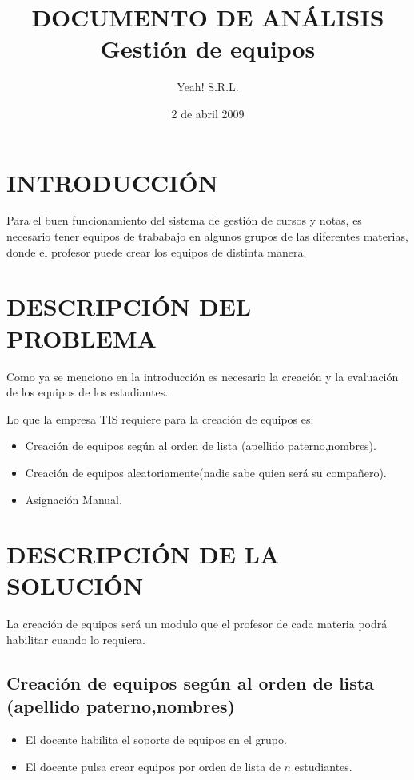 \documentclass[letterpaper,spanish]{article}
\title{\huge{\textbf{DOCUMENTO DE AN\'ALISIS \\ Gesti\'on de equipos}}}
\author{Yeah! S.R.L.}
\date{\small{2 de abril 2009}}
\begin{document}
\maketitle \pagebreak \tableofcontents \pagebreak

\section{INTRODUCCI\'ON}

Para el buen funcionamiento del sistema de gesti\'on de cursos y notas, es necesario tener equipos de 
trababajo en algunos grupos de las diferentes materias, donde el profesor puede crear los equipos de 
distinta manera. 

\section{DESCRIPCI\'ON DEL PROBLEMA}

Como ya se menciono en la introducci\'on es necesario la creaci\'on y la evaluaci\'on de los equipos de los 
estudiantes.

Lo que la empresa TIS requiere para la creaci\'on de equipos es: \\
\begin{itemize}
	\item Creaci\'on de equipos seg\'un al orden de lista (apellido paterno,nombres).
        \item Creaci\'on de equipos aleatoriamente(nadie sabe quien ser\'a su compa\~nero).
        \item Asignaci\'on Manual.

\end{itemize} 

\section{DESCRIPCI\'ON DE LA SOLUCI\'ON}

La creaci\'on de equipos ser\'a un modulo que el profesor de cada materia podr\'a habilitar cuando lo 
requiera.

\subsection{Creaci\'on de equipos seg\'un al orden de lista (apellido paterno,nombres)}
\begin{itemize}
    \item El docente habilita  el soporte de equipos en el grupo.
    \item El docente pulsa crear equipos por orden de lista de $n$ estudiantes.
\end{itemize}
\end{document}
